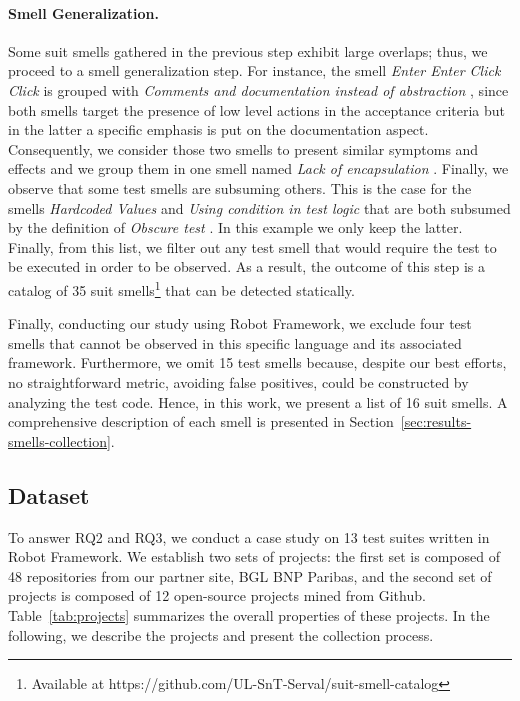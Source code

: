 \paragraph{\textbf{Smell Generalization.}}
Some \gls{suit} smells gathered in the previous step exhibit large overlaps; thus, we proceed to a smell generalization step. For instance, the smell \emph{Enter Enter Click Click} \cite{Buwalda2015} is grouped with \emph{Comments and documentation instead of abstraction} \cite{Klarck2014}, since both smells target the presence of low level actions in the acceptance criteria but in the latter a specific emphasis is put on the documentation aspect. Consequently, we consider those two smells to present similar symptoms and effects and we group them in one smell named \emph{Lack of encapsulation} \cite{Chen2012, Klarck2014, Buwalda2015, England2016, Renaudin2016}. Finally, we observe that some test smells are subsuming others. This is the case for the smells \emph{Hardcoded Values} and \emph{Using condition in test logic} that are both subsumed by the definition of \emph{Obscure test} \cite{Hauptmann2013, Gawinecki2016, Siminiuc2019}. In this example we only keep the latter.  Finally, from this list, we filter out any test smell that would require the test to be executed in order to be observed. As a result, the outcome of this step is a catalog of 35 \gls{suit} smells\footnote{Available at https://github.com/UL-SnT-Serval/suit-smell-catalog} that can be detected statically.

Finally, conducting our study using Robot Framework, we exclude four test smells that cannot be observed in this specific language and its associated framework. Furthermore, we omit 15 test smells because, despite our best efforts, no straightforward metric, avoiding false positives, could be constructed by analyzing the test code. Hence, in this work, we present a list of 16 \gls{suit} smells. A comprehensive description of each smell is presented in Section~\ref{sec:results-smells-collection}.

\subsection{Dataset}
\label{sec:data-collection}
To answer RQ2 and RQ3, we conduct a case study on 13 test suites written in Robot Framework. We establish two sets of projects: the first set is composed of 48 repositories from our partner site, BGL BNP Paribas, and the second set of projects is composed of 12 open-source projects mined from Github. Table~\ref{tab:projects} summarizes the overall properties of these projects. In the following, we describe the projects and present the collection process. 

